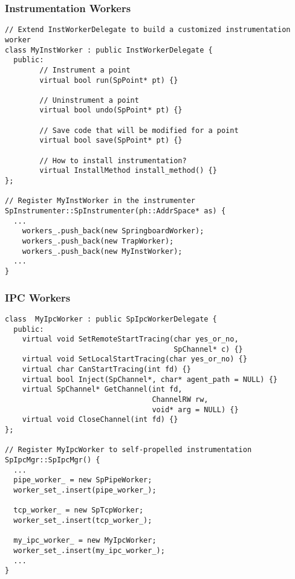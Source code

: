 \subsubsection{Instrumentation Workers}
\lstset{numbers=left}
\begin{lstlisting}[caption=Use customized instrumentation worker]
// Extend InstWorkerDelegate to build a customized instrumentation worker
class MyInstWorker : public InstWorkerDelegate {
  public:
		// Instrument a point
		virtual bool run(SpPoint* pt) {}

		// Uninstrument a point
		virtual bool undo(SpPoint* pt) {}

		// Save code that will be modified for a point
		virtual bool save(SpPoint* pt) {}

		// How to install instrumentation?
		virtual InstallMethod install_method() {}
};

// Register MyInstWorker in the instrumenter
SpInstrumenter::SpInstrumenter(ph::AddrSpace* as) {
  ...
	workers_.push_back(new SpringboardWorker);
	workers_.push_back(new TrapWorker);
	workers_.push_back(new MyInstWorker);
  ...
}
\end{lstlisting}


\subsubsection{IPC Workers}
\lstset{numbers=left}
\begin{lstlisting}[caption=Use customized IPC worker]
class  MyIpcWorker : public SpIpcWorkerDelegate {
  public:
    virtual void SetRemoteStartTracing(char yes_or_no,
                                       SpChannel* c) {}
    virtual void SetLocalStartTracing(char yes_or_no) {}
    virtual char CanStartTracing(int fd) {}
    virtual bool Inject(SpChannel*, char* agent_path = NULL) {}
    virtual SpChannel* GetChannel(int fd,
                                  ChannelRW rw,
                                  void* arg = NULL) {}
    virtual void CloseChannel(int fd) {}
};

// Register MyIpcWorker to self-propelled instrumentation
SpIpcMgr::SpIpcMgr() {
  ...
  pipe_worker_ = new SpPipeWorker;
  worker_set_.insert(pipe_worker_);

  tcp_worker_ = new SpTcpWorker;
  worker_set_.insert(tcp_worker_);
  
  my_ipc_worker_ = new MyIpcWorker;
  worker_set_.insert(my_ipc_worker_);
  ...
}
\end{lstlisting}

